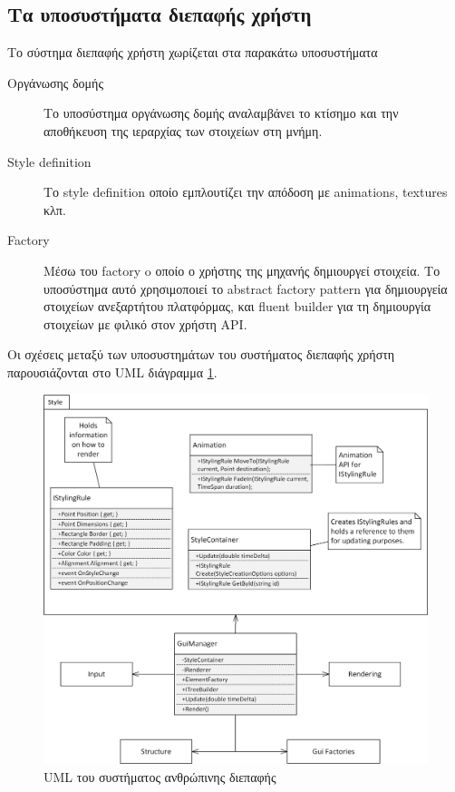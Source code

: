 \subsection{Τα υποσυστήματα διεπαφής χρήστη}	
Το σύστημα διεπαφής χρήστη χωρίζεται στα παρακάτω υποσυστήματα
	\begin{description}
		\item [Οργάνωσης δομής] Το υποσύστημα οργάνωσης δομής αναλαμβάνει το κτίσημο και την αποθήκευση της ιεραρχίας των στοιχείων στη μνήμη.
		\item [Style definition] Το style definition οποίο εμπλουτίζει την απόδοση με animations, textures κλπ.
		\item [Factory] Μέσω του factory o οποίο ο χρήστης της μηχανής δημιουργεί στοιχεία. Το υποσύστημα αυτό χρησιμοποιεί το abstract factory pattern \cite{Gamma:1995:DPE:186897} για δημιουργεία στοιχείων ανεξαρτήτου πλατφόρμας, και fluent builder για τη δημιουργία στοιχείων με φιλικό στον χρήστη \gls{API}.
	\end{description}
	
Οι σχέσεις μεταξύ των υποσυστημάτων του συστήματος διεπαφής χρήστη παρουσιάζονται στο \gls{UML} διάγραμμα \ref{fig:ui_system}.
	\begin{figure}[h!]
		\centering
		\includegraphics[width=165mm]{Images/gui_system}
		\caption{UML του συστήματος ανθρώπινης διεπαφής}
		\label{fig:ui_system}
	\end{figure}	
	
